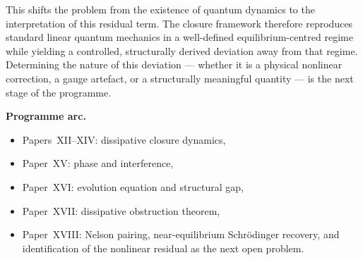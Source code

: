 \documentclass[12pt]{article}
\begin{document}
This shifts the problem from the existence of quantum dynamics to the interpretation of this residual term. The closure framework therefore reproduces standard linear quantum mechanics in a well-defined equilibrium-centred regime while yielding a controlled, structurally derived deviation away from that regime. Determining the nature of this deviation --- whether it is a physical nonlinear correction, a gauge artefact, or a structurally meaningful quantity --- is the next stage of the programme.

\textbf{Programme arc.}
\begin{itemize}
    \item Papers~XII--XIV: dissipative closure dynamics,
    \item Paper~XV: phase and interference,
    \item Paper~XVI: evolution equation and structural gap,
    \item Paper~XVII: dissipative obstruction theorem,
    \item Paper~XVIII: Nelson pairing, near-equilibrium Schr\"odinger recovery, and identification of the nonlinear residual as the next open problem.
\end{itemize}



\end{document}
